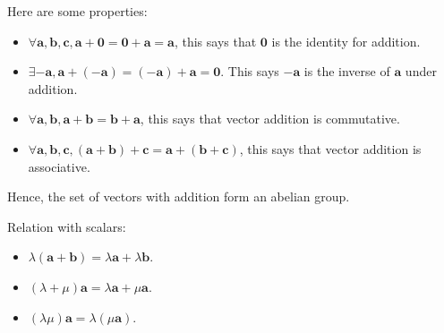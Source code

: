 \documentclass[a4paper]{article}
\begin{document}
Here are some properties:
\begin{itemize}
  \item $ \forall \mathbf{a}, \mathbf{b}, \mathbf{c},
    \mathbf{a}+\mathbf{0}=\mathbf{0}+\mathbf{a}=\mathbf{a} $, this
    says that $ \mathbf{0} $ is the identity for addition.
  \item $ \exists -\mathbf{a},
    \mathbf{a}+(-\mathbf{a})=(-\mathbf{a})+\mathbf{a}=\mathbf{0} $.
    This says $ -\mathbf{a} $ is the inverse of $ \mathbf{a} $ under addition.
  \item $ \forall \mathbf{a},\mathbf{b},
    \mathbf{a}+\mathbf{b}=\mathbf{b}+\mathbf{a} $, this says that
    vector addition is commutative.
  \item $ \forall \mathbf{a},\mathbf{b},\mathbf{c},
    (\mathbf{a}+\mathbf{b})+\mathbf{c}=\mathbf{a}+(\mathbf{b}+\mathbf{c})
    $, this says that vector addition is associative.
\end{itemize}
Hence, the set of vectors with addition form an abelian group.

Relation with scalars:
\begin{itemize}
  \item $ \lambda(\mathbf{a}+\mathbf{b})=\lambda \mathbf{a}+\lambda
    \mathbf{b} $.
  \item $ (\lambda+\mu)\mathbf{a}=\lambda \mathbf{a}+ \mu \mathbf{a} $.
  \item $ (\lambda \mu)\mathbf{a}=\lambda(\mu \mathbf{a}) $.
\end{itemize}
\end{document}
